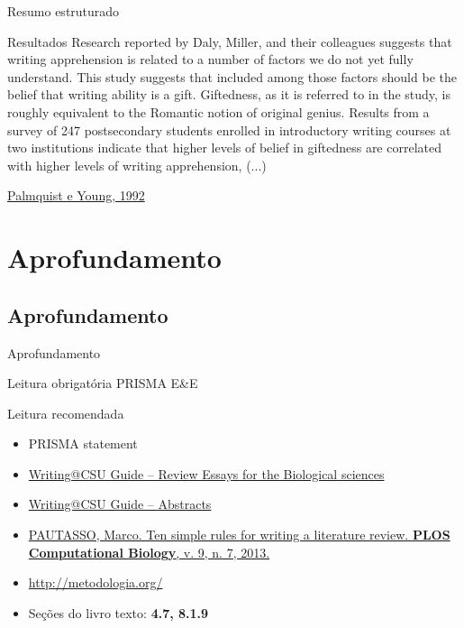 \documentclass{beamer}
\begin{document}
\begin{frame}{Resumo estruturado}
  \begin{exampleblock}{Resultados}
    \scriptsize
    Research reported by Daly, Miller, and their colleagues suggests
    that writing apprehension is related to a number of factors we do
    not yet fully understand. This study suggests that included among
    those factors should be the belief that writing ability is a
    gift. Giftedness, as it is referred to in the study, is roughly
    equivalent to the Romantic notion of original
    genius. \alert{Results} from a survey of 247 postsecondary
    students enrolled in introductory writing courses at two
    institutions \alert{indicate that higher levels of belief in
      giftedness are correlated with higher levels of writing
      apprehension,} (...)
  \end{exampleblock}

  \vfill
  \scriptsize
  \hfill \href{https://doi.org/10.1177/0741088392009001004}{Palmquist e Young, 1992}
\end{frame}

\section{Aprofundamento}

\subsection{Aprofundamento}

\begin{frame}{Aprofundamento}
  \begin{block}{Leitura obrigatória}
    \footnotesize
    PRISMA E\&E
  \end{block}
  \begin{block}{Leitura recomendada}
    \begin{itemize}
      \tiny
    \item {\footnotesize PRISMA statement}
      \medskip
    \item
      \href{https://writing.colostate.edu/guides/guide.cfm?guideid=79}{Writing@CSU Guide -- Review Essays for the Biological sciences}
    \item \href{https://writing.colostate.edu/guides/guide.cfm?guideid=59}{Writing@CSU Guide -- Abstracts}
    \item \href{https://doi.org/10.1371/journal.pcbi.1003149}
      {PAUTASSO, Marco. Ten simple rules for writing a literature review. {\bf PLOS Computational Biology}, v. 9, n. 7, 2013.}
    \item \url{http://metodologia.org/}
    \item Seções do livro texto: {\bf 4.7, 8.1.9}
    \end{itemize}
  \end{block}
\end{frame}
\end{document}
